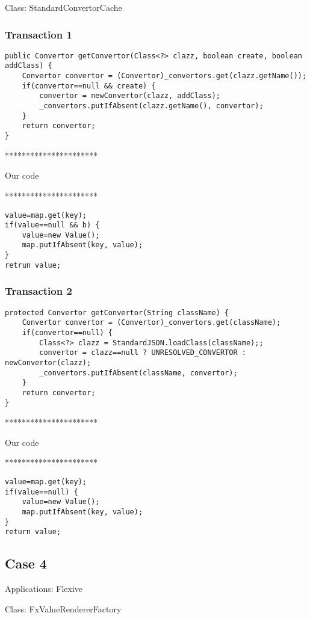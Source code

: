 Class: StandardConvertorCache

\subsubsection{Transaction 1}
\begin{lstlisting}
public Convertor getConvertor(Class<?> clazz, boolean create, boolean addClass) {
	Convertor convertor = (Convertor)_convertors.get(clazz.getName());
	if(convertor==null && create) {
		convertor = newConvertor(clazz, addClass);
		_convertors.putIfAbsent(clazz.getName(), convertor);
	}
	return convertor;
}
\end{lstlisting}


**********************

Our code

**********************

\begin{lstlisting}
value=map.get(key);
if(value==null && b) {
	value=new Value();
	map.putIfAbsent(key, value);
}
retrun value;
\end{lstlisting}

\subsubsection{Transaction 2}
\begin{lstlisting}
protected Convertor getConvertor(String className) {
	Convertor convertor = (Convertor)_convertors.get(className);
	if(convertor==null) {
		Class<?> clazz = StandardJSON.loadClass(className);;
		convertor = clazz==null ? UNRESOLVED_CONVERTOR : newConvertor(clazz);
		_convertors.putIfAbsent(className, convertor);
	}
	return convertor;
}
\end{lstlisting}


**********************

Our code

**********************

\begin{lstlisting}
value=map.get(key);
if(value==null) {
	value=new Value();
	map.putIfAbsent(key, value);
}
return value;
\end{lstlisting}

\subsection{Case 4}
Applications: Flexive

Class: FxValueRendererFactory

